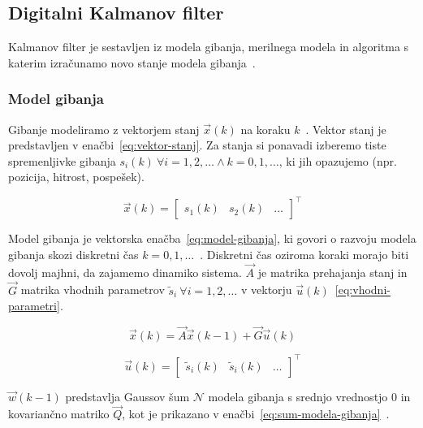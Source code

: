 \subsection{Digitalni Kalmanov filter}\label{sec:kalmanov-filter}
Kalmanov filter je sestavljen iz modela gibanja, merilnega modela in algoritma s katerim izračunamo novo stanje modela gibanja~\cite{trucco1998introductory}.

\subsubsection{Model gibanja}
Gibanje modeliramo z vektorjem stanj $\vec{x}(k)$ na koraku $k$~\cite{trucco1998introductory}. Vektor stanj je predstavljen v enačbi~\eqref{eq:vektor-stanj}. Za stanja si ponavadi izberemo tiste spremenljivke gibanja $s_i(k)~\forall i = 1,2,\ldots \land k = 0, 1,\ldots$, ki jih opazujemo (npr. pozicija, hitrost, pospešek).

\begin{equation}
\vec{x}(k) = \begin{bmatrix}
					s_1(k) & s_2(k) & \ldots
\end{bmatrix}^\top
\label{eq:vektor-stanj} 
\end{equation}


Model gibanja je vektorska enačba~\eqref{eq:model-gibanja}, ki govori o razvoju modela gibanja skozi diskretni čas $k = 0,1,\ldots$~\cite{trucco1998introductory}. Diskretni čas oziroma koraki morajo biti dovolj majhni, da zajamemo dinamiko sistema. $\vec{A}$ je matrika prehajanja stanj in $\vec{G}$ matrika vhodnih parametrov $\tilde{s}_i~\forall i = 1,2,\ldots$ v vektorju $\vec{u}(k)$~\eqref{eq:vhodni-parametri}. 



\begin{equation}
\vec{x}(k) = \vec{A} \vec{x}(k-1) + \vec{G} \vec{u}(k)
\label{eq:model-gibanja}
\end{equation}

\begin{equation}
\vec{u}(k) = \begin{bmatrix}
					\tilde{s}_i(k) & \tilde{s}_i(k) & \ldots
			\end{bmatrix}^\top 
\label{eq:vhodni-parametri}
\end{equation}

$\vec{w}(k-1)$ predstavlja Gaussov šum $\mathcal{N}$ modela gibanja s srednjo vrednostjo $0$ in kovariančno matriko $\vec{Q}$, kot je prikazano v enačbi~\eqref{eq:sum-modela-gibanja}~\cite{trucco1998introductory}.


